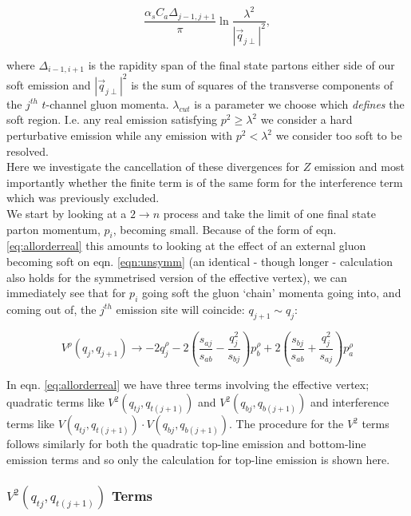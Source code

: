 		\begin{equation}
			\frac{\alpha_s C_a \Delta_{j-1, j+1}}{\pi}\ln{\frac{\lambda^2}{|\vec{q}_{j\perp}|^2}},
		\end{equation}

		where $\Delta_{i-1, i+1}$ is the rapidity span of the final state partons either side of our
		soft emission and $|\vec{q}_{j\perp}|^2$ is the sum of squares of the transverse components of
		the $j^{th}$ $t$-channel gluon momenta.  $\lambda_{cut}$ is a parameter we choose which \emph{defines}
		the soft region.  I.e. any real emission satisfying $p^2 \geq \lambda^2$ we consider a hard perturbative
		emission while any emission with $p^2 < \lambda^2$ we consider too soft to be resolved.\\
		Here we investigate
		the cancellation of these divergences for $Z$ emission and most importantly whether the finite term
		is of the same form for the interference term which was previously excluded.\\We start by looking
		at a $2\rightarrow n$ process and take the limit of one final state parton momentum, $p_i$, becoming
		small.  Because of the form of eqn. \eqref{eq:allorderreal} this amounts to looking at the
		effect of an external gluon becoming soft on eqn. \eqref{eqn:unsymm} (an identical - though
		longer - calculation also holds for the symmetrised version of the effective vertex), we can
		immediately see that for $p_i$ going soft the gluon `chain' momenta going into,
		and coming out of, the $j^{th}$ emission site will coincide: $q_{j+1}\sim q_j$:

		\begin{equation}
			V^\rho(q_j, q_{j+1}) \rightarrow -2q_j^\rho - 2\left(\frac{s_{aj}}{s_{ab}} -
				\frac{q^2_{j}}{s_{bj}}\right)p_b^\rho + 2\left(\frac{s_{bj}}{s_{ab}} +
				\frac{q_j^2}{s_{aj}}\right)p_a^\rho
				\label{eqn:vertexlimit}
		\end{equation}

		In eqn. \eqref{eq:allorderreal} we have three terms involving the effective vertex;
		quadratic terms like $V^2(q_{tj}, q_{t(j+1)})$ and $V^2(q_{bj}, q_{b(j+1)})$ and interference terms
		like $V(q_{tj}, q_{t(j+1)})\cdot V(q_{bj}, q_{b(j+1)})$.  The procedure for the $V^2$ terms follows
		similarly for both the quadratic top-line emission and bottom-line emission terms and so only
		the calculation for top-line emission is shown here.

		\subsubsection{$V^2(q_{tj}, q_{t(j+1)})$ Terms}

